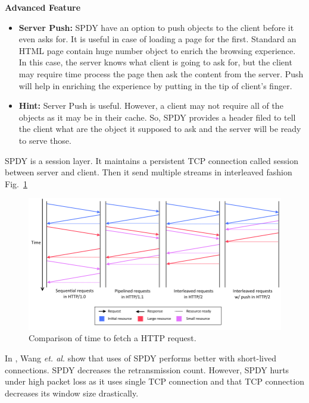 \textbf{Advanced Feature}
\begin{itemize}
    \item \textbf{Server Push:} SPDY have an option to push objects to the client before it even asks for. It is useful in case of loading a page for the first. Standard an HTML page contain huge number object to enrich the browsing experience. In this case, the server knows what client is going to ask for, but the client may require time process the page then ask the content from the server. Push will help in enriching the experience by putting in the tip of client's finger.
    \item \textbf{Hint:} Server Push is useful. However, a client may not require all of the objects as it may be in their cache. So, SPDY provides a header filed to tell the client what are the object it supposed to ask and the server will be ready to serve those.
\end{itemize}


SPDY is a session layer. It maintains a persistent TCP connection called session between server and client. Then it send multiple streams in interleaved fashion Fig.~\ref{fig:http-timing-diagram}

\begin{figure}[h]
    \centering
    \includegraphics[width=0.7\linewidth]{img/spdy/http-timing-diagram}
    \caption{Comparison of time to fetch a HTTP request.}
    \label{fig:http-timing-diagram}
\end{figure}


In \cite{howspeedis}, Wang \textit{et. al.} show that uses of SPDY performs better with short-lived connections. SPDY decreases the retransmission count. However, SPDY hurts under high packet loss as it uses single TCP connection and that TCP connection decreases its window size drastically. 

